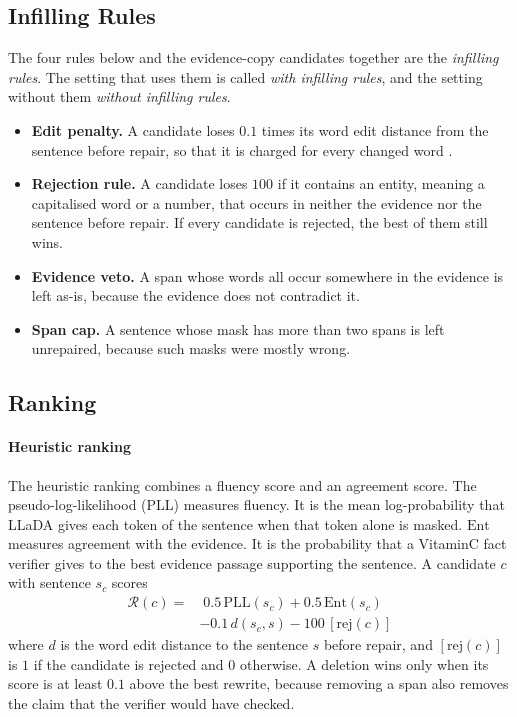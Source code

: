\documentclass[11pt]{article}
\begin{document}
\subsection{Infilling Rules}
The four rules below and the evidence-copy candidates together are the \emph{infilling rules}. The setting that uses them is called \emph{with infilling rules}, and the setting without them \emph{without infilling rules}.
\begin{itemize}[leftmargin=*,itemsep=1pt]
    \item \textbf{Edit penalty.} A candidate loses $0.1$ times its word edit distance from the sentence before repair, so that it is charged for every changed word \citep{chen-etal-2022-converge}.
    \item \textbf{Rejection rule.} A candidate loses $100$ if it contains an entity, meaning a capitalised word or a number, that occurs in neither the evidence nor the sentence before repair. If every candidate is rejected, the best of them still wins.
    \item \textbf{Evidence veto.} A span whose words all occur somewhere in the evidence is left as-is, because the evidence does not contradict it.
    \item \textbf{Span cap.} A sentence whose mask has more than two spans is left unrepaired, because such masks were mostly wrong.
\end{itemize}

\subsection{Ranking}
\paragraph{Heuristic ranking}
The heuristic ranking combines a fluency score and an agreement score. The pseudo-log-likelihood (PLL) measures fluency. It is the mean log-probability that LLaDA gives each token of the sentence when that token alone is masked. $\mathrm{Ent}$ measures agreement with the evidence. It is the probability that a VitaminC fact verifier \citep{schuster-etal-2021-vitaminc} gives to the best evidence passage supporting the sentence. A candidate $c$ with sentence $s_c$ scores
    \begin{equation}
    \begin{aligned}
    \mathcal{R}(c) = &\; 0.5\,\mathrm{PLL}(s_c) + 0.5\,\mathrm{Ent}(s_c) \\
                     &- 0.1\,d(s_c, s) - 100\,[\mathrm{rej}(c)]
    \end{aligned}
  	\end{equation}
where $d$ is the word edit distance to the sentence $s$ before repair, and $[\mathrm{rej}(c)]$ is $1$ if the candidate is rejected and $0$ otherwise. A deletion wins only when its score is at least $0.1$ above the best rewrite, because removing a span also removes the claim that the verifier would have checked.
\end{document}
